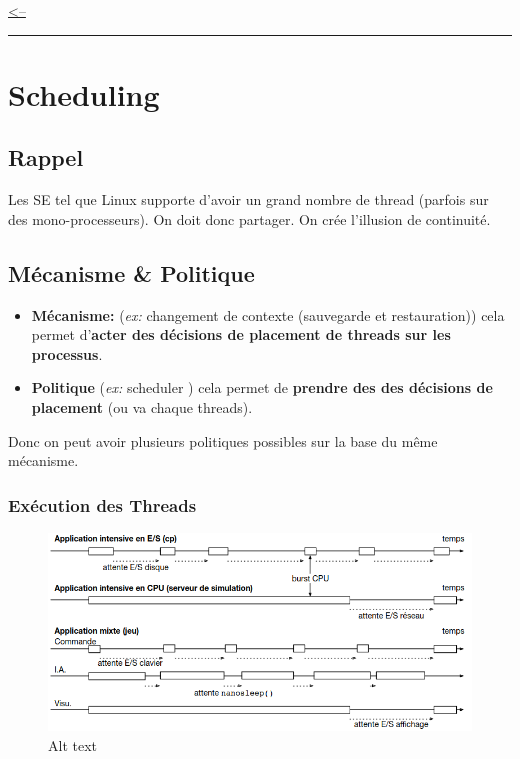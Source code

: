 \href{../README.md}{\textless--}

\begin{center}\rule{0.5\linewidth}{0.5pt}\end{center}

\section{Scheduling}\label{scheduling}

\subsection{Rappel}\label{rappel}

Les SE tel que Linux supporte d'avoir un grand nombre de thread (parfois
sur des mono-processeurs). On doit donc partager. On crée l'illusion de
continuité.

\subsection{Mécanisme \& Politique}\label{muxe9canisme-politique}

\begin{itemize}
\tightlist
\item
  \textbf{Mécanisme:} (\emph{ex:} changement de contexte (sauvegarde et
  restauration)) cela permet d'\textbf{acter des décisions de placement
  de threads sur les processus}.
\item
  \textbf{Politique} (\emph{ex:} scheduler ) cela permet de
  \textbf{prendre des des décisions de placement} (ou va chaque
  threads).
\end{itemize}

Donc on peut avoir plusieurs politiques possibles sur la base du même
mécanisme.

\subsubsection{Exécution des Threads}\label{exuxe9cution-des-threads}

\begin{figure}
\centering
\includegraphics{image-28.png}
\caption{Alt text}
\end{figure}

